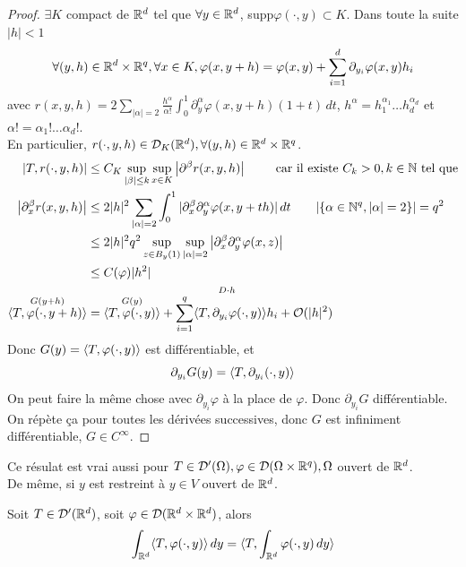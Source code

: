 \documentclass[]{report}
\begin{document}
    \begin{proof}
        $\exists K$ compact de $\mathbb{R}^d$ tel que $\forall y\in \mathbb{R}^d$, supp$\varphi(\cdot,y)\subset K$. Dans toute la suite $|h|<1$\\
        \[\forall (y,h)\in \mathbb{R}^d\times \mathbb{R}^q,\forall x\in K,\varphi(x,y+h)=\varphi(x,y)+\sum_{i=1}^{d}\partial_{y_i}\varphi(x,y)h_i\]
        avec $r(x,y,h)=2\sum_{|\alpha|=2}\frac{h^\alpha}{\alpha!}\int_{0}^{1}\partial_y^\alpha \varphi(x,y+h)(1+t)\, dt$, $h^\alpha=h_1^{\alpha_1}\ldots h_d^{\alpha_d}$ et $\alpha!=\alpha_1!\ldots \alpha_d!$.\\
        En particulier, $r(\cdot,y,h)\in \mathcal{D}_K(\mathbb{R}^d),\forall (y,h)\in\mathbb{R}^d\times \mathbb{R}^q$.
        \begin{align*}
            \left|T,r(\cdot,y,h)\right|&\le C_K \sup_{|\beta|\le k}\sup_{x\in K}\left|\partial^\beta r(x,y,h)\right|\qquad \text{ car il existe $C_k>0,k\in \mathbb{N}$ tel que}\\
            \left|\partial_x^{\beta} r(x,y,h)\right|&\le 2|h|^2\sum_{|\alpha|=2}\int_{0}^{1}|\partial_x^\beta\partial_y^\alpha \varphi(x,y+th)|\, dt\qquad |\{\alpha\in \mathbb{N}^q,|\alpha|=2\}|=q^2\\
            &\le 2|h|^2 q^2 \sup_{z\in B_y(1)}\sup_{|\alpha|=2}\left|\partial_x^\beta \partial_y^\alpha \varphi(x,z)\right|\\
            &\le C(\varphi)|h^2|\\
            \overset{G(y+h)}{\langle T,\varphi(\cdot,y+h) \rangle}&=\overset{G(y)}{\langle T,\varphi(\cdot,y) \rangle} + \overset{D\cdot h}{\sum_{i=1}^{q}\langle T,\partial_{y_i} \varphi(\cdot,y) \rangle h_i}+\mathcal{O}(|h|^2)
        \end{align*}
        Donc $G(y)=\langle T,\varphi(\cdot,y) \rangle$ est différentiable, et
        \[\partial_{y_i}G(y)=\langle T,\partial_{y_i}(\cdot,y) \rangle\]
        On peut faire la même chose avec $\partial_{y_i}\varphi$ à la place de $\varphi$. Donc $\partial_{y_i} G$ différentiable. On répète ça pour toutes les dérivées successives, donc $G$ est infiniment différentiable, $G\in C^\infty$.
    \end{proof}

    \begin{re}{}{}
        Ce résulat est vrai aussi pour $T\in \mathcal{D}'(\Omega),\varphi\in \mathcal{D}(\Omega\times \mathbb{R}^q),\Omega$ ouvert de $\mathbb{R}^d$.\\
        De même, si $y$ est restreint à $y\in V$ ouvert de $\mathbb{R}^d$.
    \end{re}

    \begin{prop}{}{}
        Soit $T\in \mathcal{D}'(\mathbb{R}^d)$, soit $\varphi\in \mathcal{D}(\mathbb{R}^d\times \mathbb{R}^d)$, alors
        \[\int_{\mathbb{R}^d}\langle T,\varphi(\cdot,y) \rangle\, dy=\langle T,\int_{\mathbb{R}^d}\varphi(\cdot,y)\, dy \rangle\]
    \end{prop}
\end{document}
